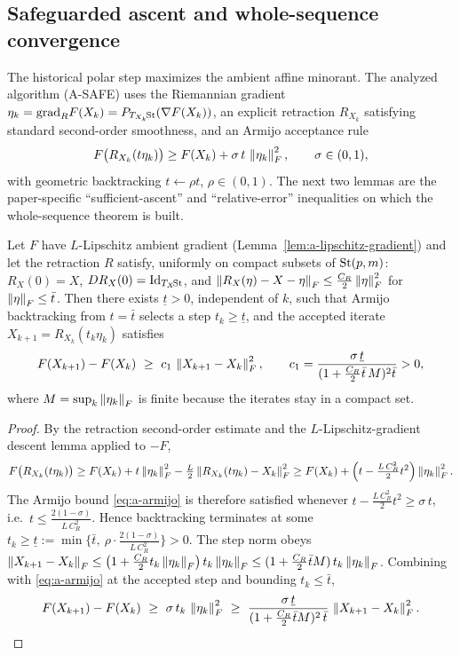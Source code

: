 \subsection{Safeguarded ascent and whole-sequence convergence}
The historical polar step maximizes the ambient affine minorant. The analyzed algorithm (A-SAFE) uses the Riemannian gradient $\eta_k=\mathrm{grad}_R F(X_k)=P_{T_{X_k}\!\mathrm{St}}(\nabla F(X_k))$, an explicit retraction $R_{X_k}$ satisfying standard second-order smoothness, and an Armijo acceptance rule
\begin{equation}
F\bigl(R_{X_k}(t\eta_k)\bigr)\ge F(X_k)+\sigma\,t\,\left\lVert \eta_k \right\rVert_F^2,\qquad \sigma\in(0,1),
\label{eq:a-armijo}
\end{equation}
with geometric backtracking $t\gets\rho t$, $\rho\in(0,1)$. The next two lemmas are the paper-specific ``sufficient-ascent'' and ``relative-error'' inequalities on which the whole-sequence theorem is built.

\begin{lemma}
\label{lem:a-sufficient-ascent}
Let $F$ have $L$-Lipschitz ambient gradient (Lemma~\ref{lem:a-lipschitz-gradient}) and let the retraction $R$ satisfy, uniformly on compact subsets of $\mathrm{St}(p,m)$: $R_X(0)=X$, $DR_X(0)=\mathrm{Id}_{T_X\!\mathrm{St}}$, and $\left\lVert R_X(\eta)-X-\eta \right\rVert_F\le\tfrac{C_R}{2}\left\lVert \eta \right\rVert_F^2$ for $\left\lVert \eta \right\rVert_F\le\bar t$. Then there exists $\underline t>0$, independent of $k$, such that Armijo backtracking from $t=\bar t$ selects a step $t_k\ge\underline t$, and the accepted iterate $X_{k+1}=R_{X_k}(t_k\eta_k)$ satisfies
\begin{equation}
F(X_{k+1})-F(X_k)\ \ge\ c_1\,\norm{X_{k+1}-X_k}_F^2,
\qquad c_1=\frac{\sigma\,\underline t}{(1+\tfrac{C_R}{2}\bar t\,M)^{2}\bar t}>0,
\label{eq:a-sufficient-ascent}
\end{equation}
where $M=\sup_k\left\lVert \eta_k \right\rVert_F$ is finite because the iterates stay in a compact set.
\end{lemma}
\begin{proof}
By the retraction second-order estimate and the $L$-Lipschitz-gradient descent lemma applied to $-F$,
\[
F\bigl(R_{X_k}(t\eta_k)\bigr)
\ge F(X_k)+t\left\lVert \eta_k \right\rVert_F^2-\tfrac{L}{2}\left\lVert R_{X_k}(t\eta_k)-X_k \right\rVert_F^2
\ge F(X_k)+\Bigl(t-\tfrac{L\,C_R^2}{2}t^2\Bigr)\left\lVert \eta_k \right\rVert_F^2.
\]
The Armijo bound \eqref{eq:a-armijo} is therefore satisfied whenever
$t-\tfrac{L\,C_R^2}{2}t^2\ge\sigma\,t$, i.e.\ $t\le\tfrac{2(1-\sigma)}{L\,C_R^2}$. Hence backtracking terminates at some $t_k\ge\underline t:=\min\bigl\{\bar t,\ \rho\cdot\tfrac{2(1-\sigma)}{L\,C_R^2}\bigr\}>0$. The step norm obeys $\left\lVert X_{k+1}-X_k \right\rVert_F\le \bigl(1+\tfrac{C_R}{2}t_k\left\lVert \eta_k \right\rVert_F\bigr)\,t_k\left\lVert \eta_k \right\rVert_F\le (1+\tfrac{C_R}{2}\bar t M)\,t_k\left\lVert \eta_k \right\rVert_F$. Combining with \eqref{eq:a-armijo} at the accepted step and bounding $t_k\le\bar t$,
\[
F(X_{k+1})-F(X_k)\ \ge\ \sigma\,t_k\,\norm{\eta_k}_F^2
\ \ge\ \frac{\sigma\,\underline t}{(1+\tfrac{C_R}{2}\bar t M)^{2}\,\bar t}\,\norm{X_{k+1}-X_k}_F^2.
\]
\end{proof}

